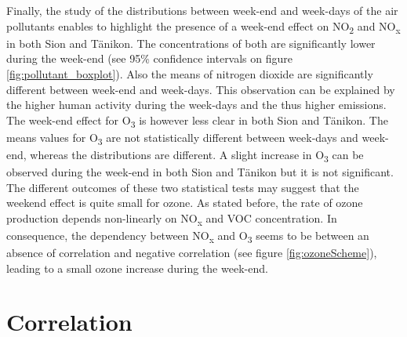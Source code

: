 \documentclass[a4paper, 12pt]{article}
\begin{document}
    Finally, the study of the distributions between week-end and week-days of the air pollutants enables to highlight the presence of a week-end effect on NO\textsubscript{2} and NO\textsubscript{x} in both Sion and Tänikon. The concentrations of both are significantly lower during the week-end (see 95\% confidence intervals on figure \ref{fig:pollutant_boxplot}). Also the means of nitrogen dioxide are significantly different between week-end and week-days. This observation can be explained by the higher human activity during the week-days and the thus higher emissions. The week-end effect for O\textsubscript{3} is however less clear in both Sion and Tänikon. The means values for O\textsubscript{3} are not statistically different between week-days and week-end, whereas the distributions  are different. A slight increase in O\textsubscript{3} can be observed during the week-end in both Sion and Tänikon but it is not significant. The different outcomes of these two statistical tests may suggest that the weekend effect is quite small for ozone. As stated before, the rate of ozone production depends non-linearly on NO\textsubscript{x} and VOC concentration. In consequence, the dependency between NO\textsubscript{x} and O\textsubscript{3} seems to be between an absence of correlation and negative correlation (see figure \ref{fig:ozoneScheme}), leading to a small ozone increase during the week-end.
 
\section{Correlation}
\end{document}
